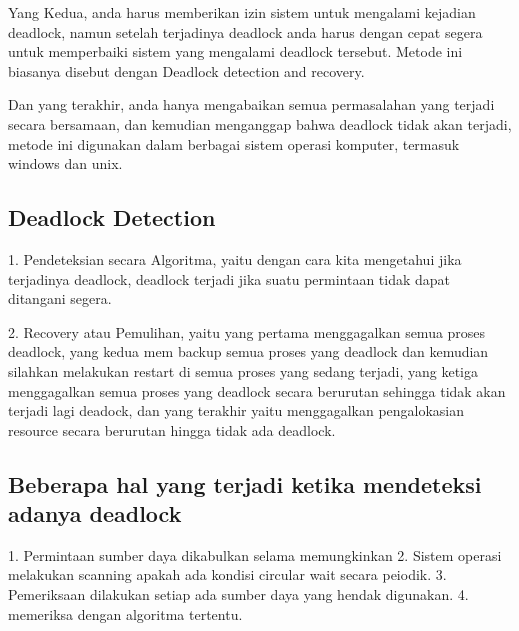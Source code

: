 	Yang Kedua, anda harus memberikan izin sistem untuk mengalami kejadian deadlock, namun setelah terjadinya deadlock anda harus dengan cepat segera untuk memperbaiki sistem yang mengalami deadlock tersebut. Metode ini biasanya disebut dengan Deadlock detection and recovery.
	
	Dan yang terakhir, anda hanya mengabaikan semua permasalahan yang terjadi secara bersamaan, dan kemudian menganggap bahwa deadlock tidak akan terjadi, metode ini digunakan dalam berbagai sistem operasi komputer, termasuk windows dan unix.
	
	
\subsection {Deadlock Detection}
	1. Pendeteksian secara Algoritma, yaitu dengan cara kita mengetahui jika terjadinya deadlock, deadlock terjadi jika suatu permintaan tidak dapat ditangani segera.
	
	2. Recovery atau Pemulihan, yaitu yang pertama menggagalkan semua proses deadlock, yang kedua mem backup semua proses yang deadlock dan kemudian silahkan melakukan restart di semua proses yang sedang terjadi, yang ketiga menggagalkan semua proses yang deadlock secara berurutan sehingga tidak akan terjadi lagi deadock, dan yang terakhir yaitu menggagalkan pengalokasian resource secara berurutan hingga tidak ada deadlock.
	
\subsection {Beberapa hal yang terjadi ketika mendeteksi adanya deadlock}
	1. Permintaan sumber daya dikabulkan selama memungkinkan
	2. Sistem operasi melakukan scanning apakah ada kondisi circular wait secara peiodik.
	3. Pemeriksaan dilakukan setiap ada sumber daya yang hendak digunakan.
	4. memeriksa dengan algoritma tertentu.
	
